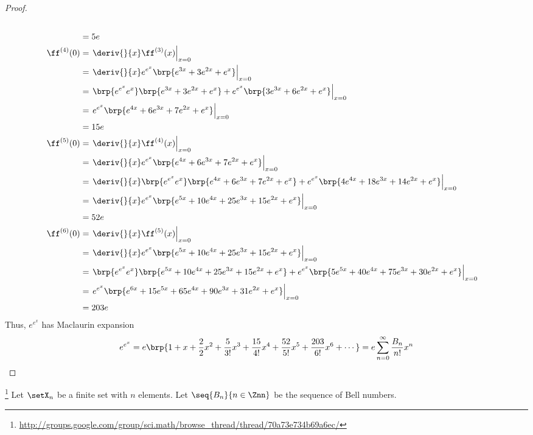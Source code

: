\begin{proof}
\begin{align*}
  \\&= 5e
  \\
  \ff^{(4)}(0)
    &= \left.\deriv{}{x}\ff^{(3)}(x)\right|_{x=0}
  \\&= \left. \deriv{}{x} e^{e^x} \brp{e^{3x} + 3e^{2x} + e^x}  \right|_{x=0}
  \\&= \left. \brp{e^{e^x}e^x} \brp{e^{3x} + 3e^{2x} + e^x} + e^{e^x}\brp{3e^{3x} + 6e^{2x} + e^x}  \right|_{x=0}
  \\&= \left. e^{e^x} \brp{e^{4x} + 6e^{3x} + 7e^{2x} + e^{x}}   \right|_{x=0}
  \\&= 15e
  \\
  \ff^{(5)}(0)
    &= \left.\deriv{}{x}\ff^{(4)}(x)\right|_{x=0}
  \\&= \left. \deriv{}{x} e^{e^x} \brp{e^{4x} + 6e^{3x} + 7e^{2x} + e^{x}}   \right|_{x=0}
  \\&= \left. \deriv{}{x} \brp{e^{e^x}e^x} \brp{e^{4x} + 6e^{3x} + 7e^{2x} + e^{x}} + e^{e^x} \brp{4e^{4x} + 18e^{3x} + 14e^{2x} + e^{x}}   \right|_{x=0}
  \\&= \left. \deriv{}{x} e^{e^x} \brp{e^{5x} + 10e^{4x} + 25e^{3x} + 15e^{2x} + e^{x}}   \right|_{x=0}
  \\&= 52e
  \\
  \ff^{(6)}(0)
    &= \left.\deriv{}{x}\ff^{(5)}(x)\right|_{x=0}
  \\&= \left. \deriv{}{x} e^{e^x} \brp{e^{5x} + 10e^{4x} + 25e^{3x} + 15e^{2x} + e^{x}}   \right|_{x=0}
  \\&= \left. \brp{e^{e^x}e^x} \brp{e^{5x} + 10e^{4x} + 25e^{3x} + 15e^{2x} + e^{x}} + e^{e^x} \brp{5e^{5x} + 40e^{4x} + 75e^{3x} + 30e^{2x} + e^{x}}   \right|_{x=0}
  \\&= \left. e^{e^x} \brp{e^{6x} + 15e^{5x} + 65e^{4x} + 90e^{3x} + 31e^{2x} + e^{x}}   \right|_{x=0}
  \\&= 203e
\end{align*}
Thus, $e^{e^x}$ has Maclaurin expansion
  \[ e^{e^x} = e\brp{1 + x + \frac{2}{2}x^2 + \frac{5}{3!}x^3 + \frac{15}{4!}x^4 + \frac{52}{5!}x^5 + \frac{203}{6!}x^6 + \cdots}
             = e \sum_{n=0}^\infty \frac{B_n}{n!} x^n \]
\end{proof}

\begin{theorem}
\footnote{
  \url{http://groups.google.com/group/sci.math/browse_thread/thread/70a73e734b69a6ec/}
  }
\label{thm:num_P}
Let $\setX_n$ be a finite set with $n$ elements.
Let $\seq{B_n}{n\in\Znn}$ be the sequence of Bell numbers.
\end{theorem}

